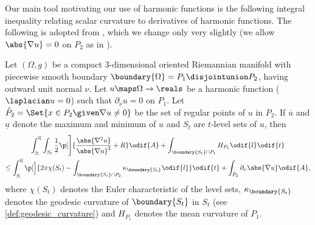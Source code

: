 \documentclass[titlepage,numbers=noenddot,oneside,%
cleardoublepage=empty,paper=a4,fontsize=11pt,%
english,%
]{scrartcl}
\begin{document}
Our main tool motivating our use of harmonic functions is the following integral inequality relating scalar curvature to derivatives of harmonic functions. The following is adopted from  \cite[Proposition 4.2]{brayHarmonicFunctionsMass2019}, which we change only very slightly (we allow \( \abs{\nabla u}=0 \) on \( P_2 \) as in \cite[Proposition 3.2]{hirschSpacetimeHarmonicFunctions2021}).
{\newcommand{\maxu}{\overline{u}}
\newcommand{\minu}{\underline{u}}
\newcommand{\nonzeroboundary}{\partial_{\neq 0}\Omega}
\begin{proposition}\label{prop:main_inequality}
    Let \( (\Omega,g) \) be a compact 3-dimensional oriented Riemannian manifold with piecewise smooth boundary \( \boundary{\Omega}=P_1\disjointunion P_2 \), having outward unit normal \( \nu \). Let \( u\maps \Omega\to \reals \) be a harmonic function (\ie \( \laplacian u=0 \)) such that \( \partial_{\nu}u=0 \) on \( P_1 \). Let \( \tilde{P}_2=\Set{x\in P_2\given \nabla u\neq 0} \) be the set of regular points of \( u \) in \( P_2 \). If \( \maxu \) and \( \minu \) denote the maximum and minimum of \( u \) and \( S_t \) are \( t \)-level sets of \( u \), then
    \begin{multline*}
        \int_{\minu}^{\maxu} \int_{S_t} \frac{1}{2}\p[\Bigg]{\frac{\abs{\nabla^2 u}}{\abs{\nabla u}^2}+R }\odif{A}+\int_{\boundary{S_t}\cap P_1}H_{P_1}\odif{l}\odif{t}\\
        \leq\int_{\minu}^{\maxu}\p[\Big]{2\pi \chi(S_t)-\int _{\boundary{S_t} \cap P_2}\kappa_{\boundary{S_t}}\odif{l}}\odif{t}+ \int_{\tilde{P}_2}\partial_{\nu} \abs{\nabla u}\odif{A},
    \end{multline*} 
    where \( \chi(S_t) \) denotes the Euler characteristic of the level sets, \( \kappa_{\boundary{S_t}} \) denotes the geodesic curvature of \( \boundary{S_t} \) in \( S_t \) (see \cref{def:geodesic_curvature}) and \( H_{P_1} \) denotes the mean curvature of \( P_1 \).
\end{proposition}

}
\end{document}
